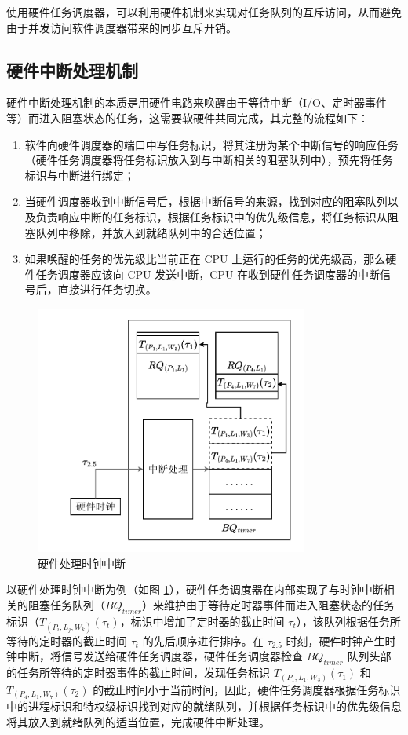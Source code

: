 使用硬件任务调度器，可以利用硬件机制来实现对任务队列的互斥访问，从而避免由于并发访问软件调度器带来的同步互斥开销。

\subsection{硬件中断处理机制}

硬件中断处理机制的本质是用硬件电路来唤醒由于等待中断（I/O、定时器事件等）而进入阻塞状态的任务，这需要软硬件共同完成，其完整的流程如下：

\begin{enumerate}
    \item 软件向硬件调度器的端口中写任务标识，将其注册为某个中断信号的响应任务（硬件任务调度器将任务标识放入到与中断相关的阻塞队列中），预先将任务标识与中断进行绑定；
    \item 当硬件调度器收到中断信号后，根据中断信号的来源，找到对应的阻塞队列以及负责响应中断的任务标识，根据任务标识中的优先级信息，将任务标识从阻塞队列中移除，并放入到就绪队列中的合适位置；
    \item 如果唤醒的任务的优先级比当前正在 CPU 上运行的任务的优先级高，那么硬件任务调度器应该向 CPU 发送中断，CPU 在收到硬件任务调度器的中断信号后，直接进行任务切换。
\end{enumerate}

\begin{figure}[htbp]
    \centering
    \includegraphics[width=0.8\textwidth]{figures/pdfs/timer.pdf}
    \caption{硬件处理时钟中断}
    \label{figure:timer}
\end{figure}

以硬件处理时钟中断为例（如图 \ref{figure:timer}），硬件任务调度器在内部实现了与时钟中断相关的阻塞任务队列（$BQ_{timer}$）来维护由于等待定时器事件而进入阻塞状态的任务标识（$T_{(P_{i}, L_{j}, W_{k})}(\tau_{t})$，标识中增加了定时器的截止时间 $\tau_{t}$），该队列根据任务所等待的定时器的截止时间 $\tau_{t}$ 的先后顺序进行排序。在 $\tau_{2.5}$ 时刻，硬件时钟产生时钟中断，将信号发送给硬件任务调度器，硬件任务调度器检查 $BQ_{timer}$ 队列头部的任务所等待的定时器事件的截止时间，发现任务标识 $T_{(P_{1}, L_{1}, W_{3})}(\tau_{1})$ 和 $T_{(P_{4}, L_{1}, W_{7})}(\tau_{2})$ 的截止时间小于当前时间，因此，硬件任务调度器根据任务标识中的进程标识和特权级标识找到对应的就绪队列，并根据任务标识中的优先级信息将其放入到就绪队列的适当位置，完成硬件中断处理。

